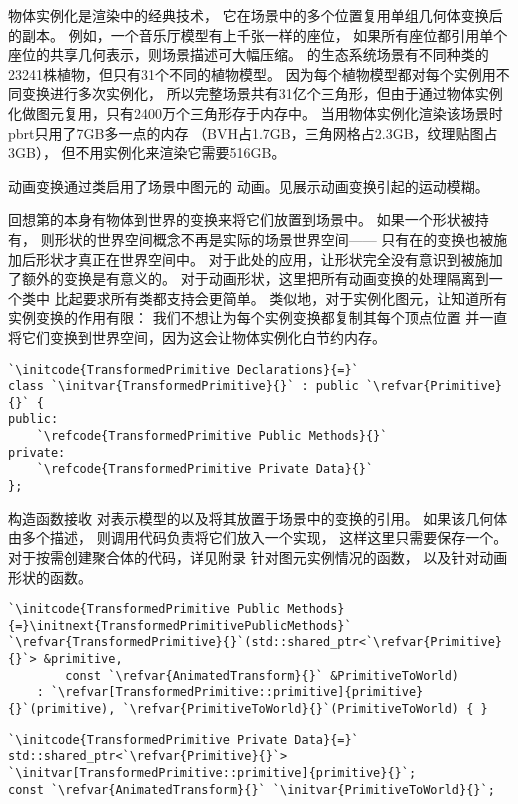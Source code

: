 物体实例化是渲染中的经典技术，
它在场景中的多个位置复用单组几何体变换后的副本。
例如，一个音乐厅模型有上千张一样的座位，
如果所有座位都引用单个座位的共享几何表示，则场景描述可大幅压缩。
的生态系统场景有不同种类的23241株植物，但只有31个不同的植物模型。
因为每个植物模型都对每个实例用不同变换进行多次实例化，
所以完整场景共有31亿个三角形，但由于通过物体实例化做图元复用，只有2400万个三角形存于内存中。
当用物体实例化渲染该场景时pbrt只用了7GB多一点的内存
（BVH占1.7GB，三角网格占2.3GB，纹理贴图占3GB），
但不用实例化来渲染它需要516GB。

动画变换通过类启用了场景中图元的
动画。见展示动画变换引起的运动模糊。

回想第的本身有物体到世界的变换来将它们放置到场景中。
如果一个形状被持有，
则形状的世界空间概念不再是实际的场景世界空间——
只有在的变换也被施加后形状才真正在世界空间中。
对于此处的应用，让形状完全没有意识到被施加了额外的变换是有意义的。
对于动画形状，这里把所有动画变换的处理隔离到一个类中
比起要求所有类都支持会更简单。
类似地，对于实例化图元，让知道所有实例变换的作用有限：
我们不想让为每个实例变换都复制其每个顶点位置
并一直将它们变换到世界空间，因为这会让物体实例化白节约内存。
\begin{lstlisting}
`\initcode{TransformedPrimitive Declarations}{=}`
class `\initvar{TransformedPrimitive}{}` : public `\refvar{Primitive}{}` {
public:
    `\refcode{TransformedPrimitive Public Methods}{}`
private:
    `\refcode{TransformedPrimitive Private Data}{}`
};
\end{lstlisting}

构造函数接收
对表示模型的以及将其放置于场景中的变换的引用。
如果该几何体由多个描述，
则调用代码负责将它们放入一个实现，
这样这里只需要保存一个。
对于按需创建聚合体的代码，详见附录
针对图元实例情况的函数\linebreak{}，
以及针对动画形状的函数。
\begin{lstlisting}
`\initcode{TransformedPrimitive Public Methods}{=}\initnext{TransformedPrimitivePublicMethods}`
`\refvar{TransformedPrimitive}{}`(std::shared_ptr<`\refvar{Primitive}{}`> &primitive,
        const `\refvar{AnimatedTransform}{}` &PrimitiveToWorld)
    : `\refvar[TransformedPrimitive::primitive]{primitive}{}`(primitive), `\refvar{PrimitiveToWorld}{}`(PrimitiveToWorld) { }
\end{lstlisting}
\begin{lstlisting}
`\initcode{TransformedPrimitive Private Data}{=}`
std::shared_ptr<`\refvar{Primitive}{}`> `\initvar[TransformedPrimitive::primitive]{primitive}{}`;
const `\refvar{AnimatedTransform}{}` `\initvar{PrimitiveToWorld}{}`;
\end{lstlisting}

